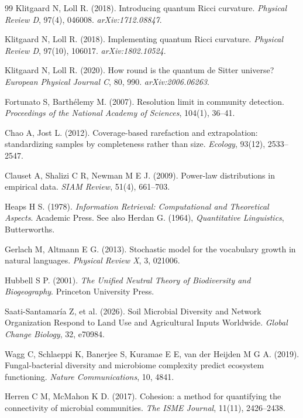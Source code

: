 \documentclass[11pt,a4paper]{article}
\begin{document}
\begin{thebibliography}{99}
Klitgaard N, Loll R. (2018).
Introducing quantum Ricci curvature.
\textit{Physical Review D}, 97(4), 046008. \textit{arXiv:1712.08847}.

Klitgaard N, Loll R. (2018).
Implementing quantum Ricci curvature.
\textit{Physical Review D}, 97(10), 106017. \textit{arXiv:1802.10524}.

Klitgaard N, Loll R. (2020).
How round is the quantum de Sitter universe?
\textit{European Physical Journal C}, 80, 990. \textit{arXiv:2006.06263}.

Fortunato S, Barthélemy M. (2007).
Resolution limit in community detection.
\textit{Proceedings of the National Academy of Sciences}, 104(1), 36--41.

Chao A, Jost L. (2012).
Coverage-based rarefaction and extrapolation: standardizing samples by
completeness rather than size.
\textit{Ecology}, 93(12), 2533--2547.

Clauset A, Shalizi C R, Newman M E J. (2009).
Power-law distributions in empirical data.
\textit{SIAM Review}, 51(4), 661--703.

Heaps H S. (1978).
\textit{Information Retrieval: Computational and Theoretical Aspects}.
Academic Press. See also Herdan G. (1964), \textit{Quantitative Linguistics},
Butterworths.

Gerlach M, Altmann E G. (2013).
Stochastic model for the vocabulary growth in natural languages.
\textit{Physical Review X}, 3, 021006.

Hubbell S P. (2001).
\textit{The Unified Neutral Theory of Biodiversity and Biogeography}.
Princeton University Press.

Saati-Santamar\'{i}a Z, et al. (2026).
Soil Microbial Diversity and Network Organization Respond to Land Use and
Agricultural Inputs Worldwide. \textit{Global Change Biology}, 32, e70984.

Wagg C, Schlaeppi K, Banerjee S, Kuramae E E, van der Heijden M G A. (2019).
Fungal-bacterial diversity and microbiome complexity predict ecosystem
functioning. \textit{Nature Communications}, 10, 4841.

Herren C M, McMahon K D. (2017).
Cohesion: a method for quantifying the connectivity of microbial communities.
\textit{The ISME Journal}, 11(11), 2426--2438.


\end{thebibliography}
\end{document}
